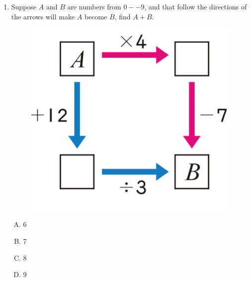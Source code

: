 \documentclass[11pt]{scrartcl}
\begin{document}
\begin{enumerate}
\newpage
\item Suppose $A$ and $B$ are numbers from $0--9$, and that follow the directions of the arrows will make $A$ become $B$, find $A + B$.
\begin{figure}[h]
    \centering
    \includegraphics{StarGen/0Figure/wmi-2020-6a-diagram-operation.png}
\end{figure}
\begin{enumerate}[(A)]
    \item 6 \item 7 \item 8 \item 9
\end{enumerate}
\end{enumerate}
\end{document}
